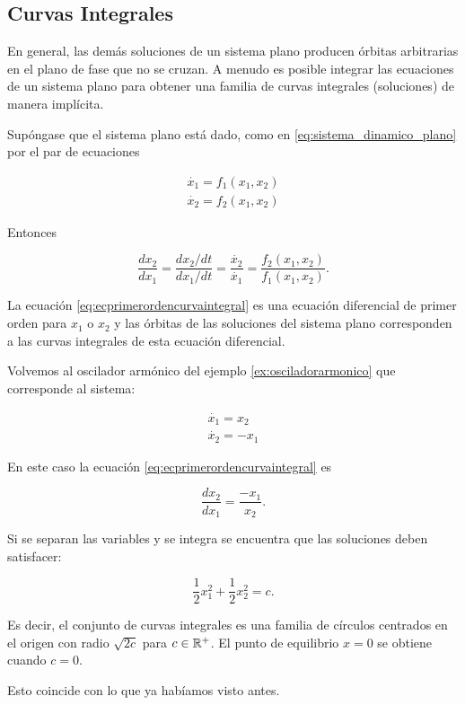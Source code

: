 \subsection{Curvas Integrales}

En general, las demás soluciones de un sistema plano producen órbitas arbitrarias en el plano de fase que no se cruzan.
A menudo es posible integrar las ecuaciones de un sistema plano para obtener una familia de curvas integrales (soluciones) de manera implícita.

Supóngase que el sistema plano está dado, como en \ref{eq:sistema_dinamico_plano} por el par de ecuaciones

$$
\begin{array}{l}
	\dot{x_1} = f_1(x_1,x_2) \\
	\dot{x_2} = f_2(x_1,x_2)
\end{array}
$$

Entonces

\begin{equation} \label{eq:ecprimerordencurvaintegral}
	\dfrac{dx_2}{dx_1} = \frac{dx_2/dt}{dx_1/dt} = \frac{\dot{x_2}}{\dot{x_1}} = \dfrac{f_2(x_1,x_2)}{f_1(x_1,x_2)}.
\end{equation}

La ecuación \ref{eq:ecprimerordencurvaintegral} es una ecuación diferencial de primer orden para $x_1$ o $x_2$ y las órbitas de las soluciones del sistema plano corresponden a las curvas integrales de esta ecuación diferencial.

\begin{example}
Volvemos al oscilador armónico del ejemplo \ref{ex:osciladorarmonico} que corresponde al sistema:

$$
\begin{array}{l}
	\dot{x_1} = x_2 \\
	\dot{x_2} = -x_1
\end{array}
$$

En este caso la ecuación \ref{eq:ecprimerordencurvaintegral} es

$$ \dfrac{dx_2}{dx_1} = \frac{-x_1}{x_2}.$$

Si se separan las variables y se integra se encuentra que las soluciones deben satisfacer:

$$ \frac{1}{2}x_1^2 + \frac{1}{2}x_2^2 = c.$$

Es decir, el conjunto de curvas integrales es una familia de círculos centrados en el origen con radio $\sqrt{2c}$ para $c \in {\ensuremath{\mathbb{R}}}^+$. El punto de equilibrio $x = 0$ se obtiene cuando $c = 0$.

Esto coincide con lo que ya habíamos visto antes.
\end{example}


